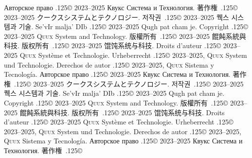 \documentclass{cookbook}
\begin{document}
{{{\foreignlanguage{russian}{Авторское право} %
	{\lower.125\baselineskip\hbox{\copyright}}
	2023–2025 \foreignlanguage{russian}{Квукс Система и Технология.}
著作権~{\lower.125\baselineskip\hbox{\copyright}}
	2023--2025 クークスシステムとテクノロジー.
저작권~{\lower.125\baselineskip\hbox{\copyright}}
	2023--2025 퀙스 시스템과 기술.
Se'vIr malja' DIb {\lower.125\baselineskip\hbox{\copyright}} %
	2023--2025 Qugh pat cham je.
\texttt{{\gitabbrcommithash}}
Copyright {\lower.125\baselineskip\hbox{\copyright}}
	2023--2025 \textsc{Quux} System and Technology.
版權所有~{\lower.125\baselineskip\hbox{\copyright}}
	2023--2025 餛飩系統與科技.
版权所有~{\lower.125\baselineskip\hbox{\copyright}}
	2023--2025 馄饨系统与科技.
Droits d'auteur {\lower.125\baselineskip\hbox{\copyright}} %
	2023--2025 \textsc{Quux} Système et Technologie.
Urheberrecht {\lower.125\baselineskip\hbox{\copyright}} %
	2023--2025, \textsc{Quux} System und Technologie.
Derechos de autor {\lower.125\baselineskip\hbox{\copyright}} %
	2023--2025, \textsc{Quux} Sistema y Tecnología.
\foreignlanguage{russian}{Авторское право} %
	{\lower.125\baselineskip\hbox{\copyright}}
	2023–2025 \foreignlanguage{russian}{Квукс Система и Технология.}
著作権~{\lower.125\baselineskip\hbox{\copyright}}
	2023--2025 クークスシステムとテクノロジー.
저작권~{\lower.125\baselineskip\hbox{\copyright}}
	2023--2025 퀙스 시스템과 기술.
Se'vIr malja' DIb {\lower.125\baselineskip\hbox{\copyright}} %
	2023--2025 Qugh pat cham je.
\texttt{{\gitabbrcommithash}}
Copyright {\lower.125\baselineskip\hbox{\copyright}}
	2023--2025 \textsc{Quux} System and Technology.
版權所有~{\lower.125\baselineskip\hbox{\copyright}}
	2023--2025 餛飩系統與科技.
版权所有~{\lower.125\baselineskip\hbox{\copyright}}
	2023--2025 馄饨系统与科技.
Droits d'auteur {\lower.125\baselineskip\hbox{\copyright}} %
	2023--2025 \textsc{Quux} Système et Technologie.
Urheberrecht {\lower.125\baselineskip\hbox{\copyright}} %
	2023--2025, \textsc{Quux} System und Technologie.
Derechos de autor {\lower.125\baselineskip\hbox{\copyright}} %
	2023--2025, \textsc{Quux} Sistema y Tecnología.
\foreignlanguage{russian}{Авторское право} %
	{\lower.125\baselineskip\hbox{\copyright}}
	2023–2025 \foreignlanguage{russian}{Квукс Система и Технология.}
著作権~{\lower.125\baselineskip\hbox{\copyright}}
}}}
\end{document}
